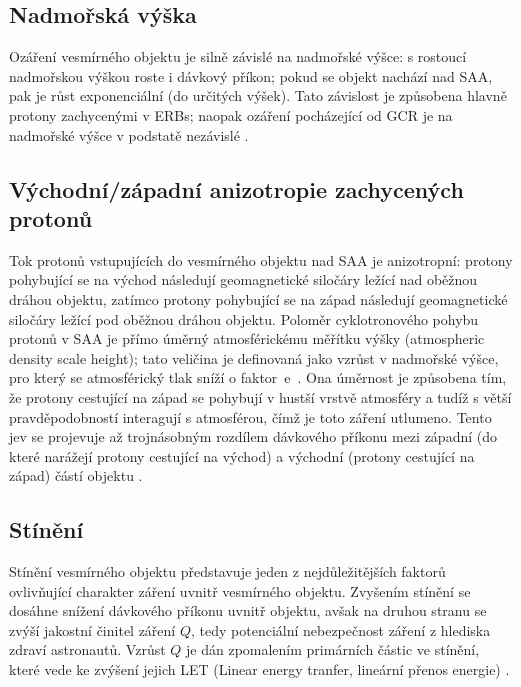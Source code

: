\subsection{Nadmořská výška}\label{sec:kosmickeZareni_altitude}
Ozáření vesmírného objektu je silně závislé na nadmořské výšce: s rostoucí nadmořskou výškou roste i dávkový příkon; pokud se objekt nachází nad SAA, pak je růst exponenciální (do určitých výšek). Tato závislost je způsobena hlavně protony zachycenými v ERBs; naopak ozáření pocházející od GCR je na nadmořské výšce v podstatě nezávislé \cite{dosis}.
\subsection{Východní/západní anizotropie zachycených protonů}\label{sec:kosmickeZareni_anizotropie}
Tok protonů vstupujících do vesmírného objektu nad SAA je anizotropní: protony pohybující se na východ následují geomagnetické siločáry ležící nad oběžnou dráhou objektu, zatímco protony pohybující se na západ následují geomagnetické siločáry ležící pod oběžnou dráhou objektu. Poloměr cyklotronového pohybu protonů v SAA %
je přímo úměrný atmosférickému měřítku výšky (atmospheric density scale height); tato veličina je definovaná jako vzrůst v nadmořské výšce, pro který se atmosférický tlak sníží o faktor~e~\cite{scaleHeight_wiki}. Ona úměrnost je způsobena tím, že protony cestující na západ se pohybují v hustší vrstvě atmosféry a tudíž s větší pravděpodobností interagují s atmosférou, čímž je toto záření utlumeno. Tento jev se projevuje až trojnásobným rozdílem dávkového příkonu mezi západní (do které narážejí protony cestující na východ) a východní (protony cestující na západ) částí objektu \cite{benton}. 
\subsection{Stínění}
Stínění vesmírného objektu představuje jeden z nejdůležitějších faktorů ovlivňující charakter záření uvnitř vesmírného objektu. Zvyšením stínění se dosáhne snížení dávkového příkonu uvnitř objektu, avšak na druhou stranu se zvýší jakostní činitel záření $Q$, tedy potenciální nebezpečnost záření z hlediska zdraví astronautů. Vzrůst $Q$ je dán zpomalením primárních částic ve stínění, které vede ke zvýšení jejich LET (Linear energy tranfer, lineární přenos energie) \cite{toNemecky}.

